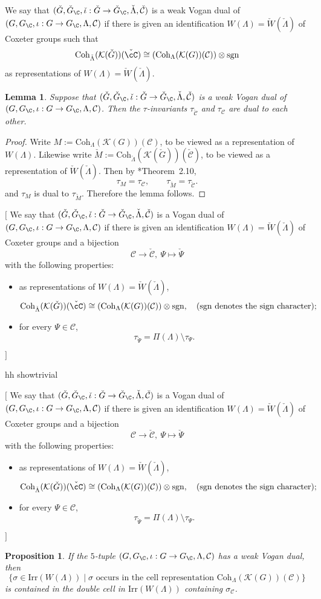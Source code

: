 \documentclass[12pt]{amsart}
\newcommand{\trivial}[2][]{\if\relax\detokenize{#1}\relax
  {%
      \color{orange} \vspace{0em}$[$#2$]$
      \color{black}
  }
  \else
\ifx#1h
\ifcsname showtrivial\endcsname
{%
    \color{orange}\vspace{0em}$[$#2$]$
    \color{black}
}
\fi
\else {\red Wrong argument!} \fi
\fi
}
\newcommand{\CC}{{\mathcal {C}}}
\newcommand{\CK}{{\mathcal {K}}}
\newcommand{\sgn}{\operatorname{sgn}}
\numberwithin{equation}{section}
\newtheorem{lem}[thm]{Lemma}
\newtheorem{prop}[thm]{Proposition}
\theoremstyle{remark}
\def\Irr{\mathrm{Irr}}
\def\Coh{\mathrm{Coh}}
\begin{document}
We say  that $(\check G,\check G_\C, \check \iota: \check G\rightarrow \check G_\C, \check \Lambda, \check \CC)$ is a weak Vogan dual of $(G,G_\C, \iota: G\rightarrow G_\C, \Lambda, \CC)$ if there is given an identification  $W(\Lambda)=\check W(\check \Lambda)$ of Coxeter groups such that
    \[
    \Coh_{\check \Lambda}(\CK(\check G))(\check \cC) \cong (\Coh_{ \Lambda}(\CK( G))(\CC))\otimes \sgn
    \]
  as representations of $W(\Lambda)=\check W(\check \Lambda)$.
  \begin{lem}\label{lem:taudual}
  Suppose that $(\check G,\check G_\C, \check \iota: \check G\rightarrow \check G_\C, \check \Lambda, \check \CC)$ is a weak Vogan dual of $(G,G_\C, \iota: G\rightarrow G_\C, \Lambda, \CC)$. Then the $\tau$-invariants $\tau_{\check \CC}$ and $\tau_\CC$ are dual to each other.
  \end{lem}
\begin{proof}
  Write $M:=\Coh_\Lambda(\CK(G))(\CC)$, to be viewed as a representation of $W(\Lambda)$. Likewise write $\check M:=\Coh_{\check \Lambda}(\CK(\check G))(\check \CC)$, to be viewed as a representation of $\check W(\check \Lambda)$.
  Then by \cite{FJMN}*{Theorem~2.10},
  \[
  \tau_M=\tau_\CC,\quad\quad \tau_{\check M}=\tau_{\check \CC}.
  \]
 and $\tau_M$ is dual to  $\tau_{\check M}$. Therefore the lemma follows.
\end{proof}
\trivial[h]{
We say  that $(\check G,\check G_\C, \check \iota: \check G\rightarrow \check G_\C, \check \Lambda, \check \CC)$ is a Vogan dual of $(G,G_\C, \iota: G\rightarrow G_\C, \Lambda, \CC)$ if there is given an identification  $W(\Lambda)=\check W(\check \Lambda)$ of Coxeter groups and a bijection
\[
\CC\rightarrow \check \CC, \ \Psi\mapsto \check \Psi
\]
with the following properties:
\begin{itemize}
    \item as representations of $W(\Lambda)=\check W(\check \Lambda)$,
    \[
    \Coh_{\check \Lambda}(\CK(\check G))(\check \cC) \cong (\Coh_{ \Lambda}(\CK( G))(\CC))\otimes \sgn, \quad(\textrm{$\sgn$ denotes the sign character});
    \]
    \item for every $\Psi\in \CC$,
  \[
    \tau_{\check \Psi}=\Pi(\Lambda)\setminus \tau_\Psi.
      \]
\end{itemize}
}
\begin{prop}\label{DualHC}
  If the $5$-tuple $(G,G_\C, \iota: G\rightarrow G_\C, \Lambda, \CC)$ has a weak Vogan dual, then \[
 \{ \sigma\in \Irr(W(\Lambda))\mid \sigma\textrm{ occurs in the cell representation $\Coh_{\Lambda}( \CK(G))(\CC)$}\}
\]
is contained in the  double cell in $\Irr(W(\Lambda))$ containing $\sigma_\CC$.
\end{prop}
\end{document}
